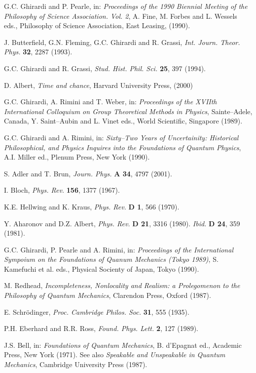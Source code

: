\documentclass[10pt,a4paper]{article}
\begin{document}
\begin{thebibliography}{999}
 G.C. Ghirardi and P. Pearle, in:  {\it Proceedings of
the 1990 Biennial Meeting of the Philosophy of Science
Association. Vol. 2}, A. Fine, M. Forbes and L. Wessels eds.,
Philosophy of Science Association, East Leasing, (1990).

 J. Butterfield, G.N. Fleming, G.C. Ghirardi and R.
Grassi, {\it Int. Journ. Theor. Phys.} {\bf 32}, 2287 (1993).

 G.C. Ghirardi and R. Grassi, {\it Stud. Hist. Phil.
Sci.} {\bf 25}, 397 (1994).

 D. Albert, {\it Time and chance}, Harvard
University Press, (2000)

 G.C. Ghirardi, A. Rimini and T. Weber, in: {\it
Proceedings of the XVIIth International Colloquium on Group
Theoretical Methods in Physics}, Sainte--Adele, Canada, Y.
Saint--Aubin and L. Vinet eds., World Scientific, Singapore
(1989).

 G.C. Ghirardi and A. Rimini, in: {\it Sixty--Two
Years of Uncertainity: Historical Philosophical, and Physics
Inquires into the Foundations of Quantum Physics}, A.I. Miller
ed., Plenum Press, New York (1990).

 S. Adler and T. Brun, {\it Journ. Phys.} {\bf A 34},
4797 (2001).

 I. Bloch, {\it Phys. Rev.} {\bf 156}, 1377 (1967).

 K.E. Hellwing and K. Kraus, {\it Phys. Rev.} {\bf D
1}, 566 (1970).

 Y. Aharonov and D.Z. Albert, {\it Phys. Rev.} {\bf D
21}, 3316 (1980). {\it Ibid.} {\bf D 24}, 359 (1981).

 G.C. Ghirardi, P. Pearle and A. Rimini, in: {\it
Proceedings of the International Sympoium on the Foundations of
Quanum Mechanics (Tokyo 1989)}, S. Kamefuchi et al. eds., Physical
Socienty of Japan, Tokyo (1990).

 M. Redhead, {\it Incompleteness, Nonlocality and
Realism: a Prolegomenon to the Philosophy of Quantum Mechanics},
Clarendon Press, Oxford (1987).

 E. Schr\"odinger, {\it Proc. Cambridge Philos.
Soc.} {\bf 31}, 555 (1935).

 P.H. Eberhard and R.R. Ross, {\it Found. Phys.
Lett.} {\bf 2}, 127 (1989).

 J.S. Bell, in: {\it Foundations of Quantum
Mechanics}, B. d'Epagnat ed., Academic Press, New York (1971). See
also {\it Speakable and Unspeakable in Quantum Mechanics},
Cambridge University Press (1987).


\end{thebibliography}
\end{document}
